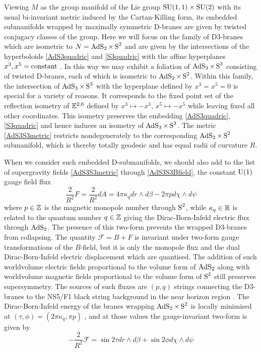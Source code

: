 Viewing $M$ as the group manifold of the Lie group ${\rm SU}(1,1)\times{\rm
  SU}(2)$ with its usual bi-invariant metric induced by the Cartan-Killing form,
its embedded submanifolds wrapped by maximally symmetric D-branes are given by
twisted conjugacy classes of the group. Here we will focus on the family of
D3-branes which are isometric to $N=\AdS_2\times\Sphere^2$ and are given by the
intersections of the hyperboloids \eqref{AdS3quadric} and \eqref{S3quadric} with
the affine hyperplanes $x^3,x^5={\rm constant}$ \cite{BP1}. In this way we may
exhibit a foliation of $\AdS_3\times\S^3$ consisting of twisted D-branes, each
of which is isometric to $\AdS_2\times\S^2$. Within this family, the
intersection of $\AdS_3\times\S^3$ with the hyperplane defined by $x^3=x^5=0$ is
special for a variety of reasons. It corresponds to the fixed point set of the
reflection isometry of $\E^{2,6}$ defined by $x^3\mapsto-x^3$,
$x^5\mapsto-x^5$ while leaving fixed all other coordinates. This isometry
preserves the embedding \eqref{AdS3quadric}, \eqref{S3quadric} and hence induces
an isometry of $\AdS_3\times\S^3$. The metric \eqref{AdS3S3metric} restricts
nondegenerately to the corresponding $\AdS_2\times\S^2$ submanifold, which is
thereby totally geodesic and has equal radii of curvature $R$.

When we consider such embedded D-submanifolds, we should also add to the list of
supergravity fields \eqref{AdS3S3metric} through \eqref{AdS3S3Bfield}, the
constant ${\rm U}(1)$ gauge field flux \cite{BP1,BDS1}
\begin{equation}
  \label{AdS3S3U1flux}
  \frac2{R^2}F=\frac2{R^2}d A=4\pi\kappa_q d r\wedge d\beta-
  2\pi p d\chi\wedge d\psi
\end{equation}
where $p\in\Z$ is the magnetic monopole number through $\S^2$, while
$\kappa_q\in\R$ is related to the quantum number $q\in\Z$ giving the
Dirac-Born-Infeld electric flux through $\AdS_2$. The presence of this two-form
prevents the wrapped D3-branes from collapsing. The quantity ${\mathcal F}=B+F$
is invariant under two-form gauge transformations of the $B$-field, but it is
only the monopole flux and the dual Dirac-Born-Infeld electric displacement
which are quantised. The addition of such worldvolume electric fields
proportional to the volume form of $\AdS_2$ along with worldvolume magnetic
fields proportional to the volume form of $\S^2$ still preserves supersymmetry.
The sources of such fluxes are $(p,q)$ strings connecting the D3-branes to the
NS5/F1 black string background in the near horizon region \cite{BP1}. The
Dirac-Born-Infeld energy of the branes wrapping $\AdS_2\times\S^2$ is locally
minimised at $(\tau,\phi)=(2\pi\kappa_q,\pi p)$ \cite{BP1,BDS1}, and at those
values the gauge-invariant two-form is given by
\begin{equation}
  \label{gaugeinvAdS3S3}
  -\frac2{R^2}\mathcal{F}=\sin2\tau d r\wedge d\beta+\sin2\phi d\chi\wedge d\psi
\end{equation}

